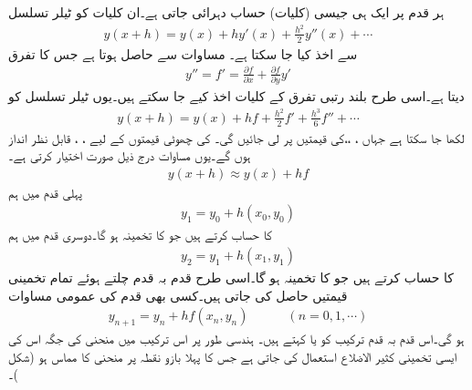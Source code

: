 ہر قدم پر ایک ہی جیسی (کلیات) حساب دہرائی جاتی ہے۔ان کلیات کو ٹیلر تسلسل
\begin{align*}
y(x+h)=y(x)+hy'(x)+\frac{h^2}{2}y''(x)+\cdots
\end{align*}
 سے اخذ کیا جا سکتا ہے۔ مساوات  سے  حاصل ہوتا ہے جس  کا تفرق
\begin{align*}
y''=f'=\tfrac{\partial f}{\partial x}+\tfrac{\partial f}{\partial y}y'
\end{align*}
دیتا ہے۔اسی طرح بلند رتبی تفرق کے کلیات اخذ کیے جا سکتے ہیں۔یوں ٹیلر تسلسل کو
\begin{align}\label{مساوات_اعدادی_ابتدائی_مسئلہ_ب}
y(x+h)=y(x)+hf+\frac{h^2}{2}f'+\frac{h^3}{6}f''+\cdots
\end{align}
لکھا جا سکتا ہے جہاں ، ،، کی قیمتیں  پر  لی جائیں گی۔ کی چھوٹی قیمتوں کے لیے ، ،  قابل نظر انداز ہوں گے۔یوں مساوات  درج ذیل صورت اختیار کرتی ہے۔
\begin{align*}
y(x+h)\approx y(x)+hf
\end{align*}
پہلی قدم میں ہم 
\begin{align*}
y_1=y_0+h(x_0,y_0)
\end{align*}
کا حساب کرتے ہیں جو  کا تخمینہ ہو گا۔دوسری قدم میں ہم
 \begin{align*}
y_2=y_1+h(x_1,y_1)
\end{align*}
کا حساب کرتے ہیں جو  کا تخمینہ ہو گا۔اسی طرح قدم بہ قدم چلتے ہوئے تمام تخمینی قیمتیں حاصل کی جاتی ہیں۔کسی بھی قدم کی عمومی مساوات
\begin{align}\label{مساوات_اعدادی_ابتدائی_مسئلہ_پ}
y_{n+1}=y_n+hf(x_n,y_n)\quad\quad\quad (n=0,1,\cdots)
\end{align}
ہو گی۔اس قدم بہ قدم ترکیب کو  یا  کہتے ہیں۔ ہندسی طور پر اس ترکیب میں  منحنی  کی جگہ اس کی ایسی تخمینی کثیر الاضلاع استعمال کی جاتی ہے جس کا پہلا بازو نقطہ  پر منحنی کا مماس ہو (شکل )۔
